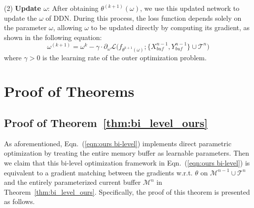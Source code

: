 \documentclass[table, xcdraw]{article}
\theoremstyle{plain}
\theoremstyle{definition}
\theoremstyle{remark}
\begin{document}
(2) \textbf{Update $\omega$}: After obtaining $\theta^{(k+1)}(\omega)$, we use this updated network to update the $\omega$ of DDN. During this process, the loss function depends solely on the parameter $\omega$, allowing $\omega$ to be updated directly by computing its gradient, as shown in the following equation:
\begin{equation}
    \omega^{(k+1)} = \omega^k - \gamma \cdot  \partial_\omega \mathcal{L}\bigl(f_{\theta^{k+1}(\omega)};\{X_{buf}^{n-1},Y_{buf}^{n-1}\} \cup\mathcal{T}^n\bigr)
    \label{omega}
\end{equation}
where $\gamma > 0$ is the learning rate of the outer optimization problem.


\section{Proof of Theorems}
\subsection{Proof of Theorem~\ref{thm:bi_level_ours}}
As aforementioned, Eqn.~(\ref{eqn:ours bi-level}) implements direct parametric optimization by treating the entire memory buffer as learnable parameters. Then we claim that this bi-level optimization framework in Eqn.~(\ref{eqn:ours bi-level}) is equivalent to a gradient matching between the gradients w.r.t. $\theta$ on $\mathcal M^{n-1} \cup \mathcal T^n$ and the entirely parameterized current buffer $\mathcal M^{n}$ in Theorem~\ref{thm:bi_level_ours}. Specifically, the proof of this theorem is presented as follows.
\end{document}

